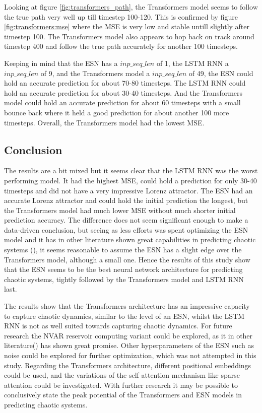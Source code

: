 \documentclass[11pt]{article}
\begin{document}
Looking at figure \ref{fig:transformers_path}, the Transformers model seems to follow the true path very well up till timestep 100-120. This is confirmed by figure \ref{fig:transformers:mse} where the MSE is very low and stable untill slightly after timestep 100. The Transformers model also appears to hop back on track around timestep 400 and follow the true path accurately for another 100 timesteps.

Keeping in mind that the ESN has a $inp\_seq\_len$ of 1, the LSTM RNN a $inp\_seq\_len$ of 9, and the Transformers model a $inp\_seq\_len$ of 49, the ESN could hold an accurate prediction for about 70-80 timesteps. The LSTM RNN could hold an accurate prediction for about 30-40 timesteps. And the Transformers model could hold an accurate prediction for about 60 timesteps with a small bounce back where it held a good prediction for about another 100 more timesteps. Overall, the Transformers model had the lowest MSE.

\subsection{Conclusion}
The results are a bit mixed but it seems clear that the LSTM RNN was the worst performing model. It had the highest MSE, could hold a prediction for only 30-40 timesteps and did not have a very impressive Lorenz attractor. The ESN had an accurate Lorenz attractor and could hold the initial prediction the longest, but the Transformers model had much lower MSE without much shorter initial prediction accuracy. The difference does not seem significant enough to make a data-driven conclusion, but seeing as less efforts was spent optimizing the ESN model and it has in other literature shown great capabilities in predicting chaotic systems (\cite{npg-27-373-2020}), it seems reasonable to assume the ESN has a slight edge over the Transformers model, although a small one. Hence the results of this study show that the ESN seems to be the best neural network architecture for predicting chaotic systems, tightly followed by the Transformers model and LSTM RNN last.

The results show that the Transformers architecture has an impressive capacity to capture chaotic dynamics, similar to the level of an ESN, whilst the LSTM RNN is not as well suited towards capturing chaotic dynamics. For future research the NVAR reservoir computing variant could be explored, as it in other literature(\cite{cite-key}) has shown great promise. Other hyperparameters of the ESN such as noise could be explored for further optimization, which was not attempted in this study. Regarding the Transformers architecture, different positional embeddings could be used, and the variations of the self attention mechanism like sparse attention could be investigated. With further research it may be possible to conclusively state the peak potential of the Transformers and ESN models in predicting chaotic systems.
\end{document}
